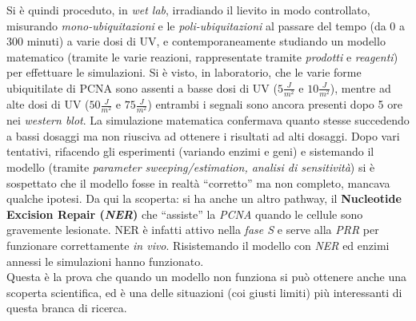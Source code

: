 \documentclass[a4paper,12pt, oneside]{book}
\begin{document}
Si è quindi proceduto, in \textit{wet lab}, irradiando il lievito in modo
controllato, misurando \textit{mono-ubiquitazioni} e le
\textit{poli-ubiquitazioni} al passare del tempo (da 0 a 300 minuti) a varie
dosi di UV, e contemporaneamente studiando un modello matematico (tramite le
varie reazioni, rappresentate tramite \textit{prodotti} e \textit{reagenti}) per
effettuare le simulazioni. Si è visto, in laboratorio, che 
le varie forme ubiquitilate di PCNA sono assenti a basse dosi di UV
($5\frac{J}{m^2}$ e $10\frac{J}{m^2}$), mentre ad alte dosi di UV
($50\frac{J}{m^2}$ e $75\frac{J}{m^2}$) entrambi i segnali sono ancora presenti
dopo 5 ore nei \textit{western blot}. La simulazione matematica confermava
quanto stesse succedendo a 
bassi dosaggi ma non riusciva ad ottenere i risultati ad alti dosaggi. Dopo vari
tentativi, rifacendo gli esperimenti (variando enzimi e geni) e sistemando il
modello (tramite \textit{parameter sweeping/estimation, analisi di sensitività})
si è sospettato che il modello fosse in realtà ``corretto'' ma non 
completo, mancava qualche ipotesi. Da qui la scoperta: si ha anche un altro
pathway, il \textbf{Nucleotide Excision Repair (\textit{NER})} che ``assiste''
la \textit{PCNA} quando le cellule sono gravemente lesionate. NER è infatti
attivo nella \textit{fase S} e serve alla \textit{PRR} per funzionare
correttamente \textit{in vivo}. Risistemando il modello con \textit{NER} ed
enzimi annessi le simulazioni hanno funzionato. \\
Questa è la prova che quando un modello non funziona si può ottenere anche una
scoperta scientifica, ed è una delle situazioni (coi giusti limiti) più
interessanti di questa branca di ricerca.
\end{document}
